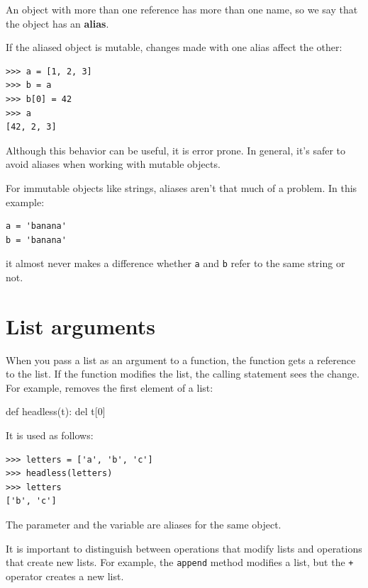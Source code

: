 An object with more than one reference has more than one name, so we say that the object has an \textbf{alias}.

If the aliased object is mutable, changes made with one alias affect the other:

\begin{Verbatim}[frame=single]
>>> a = [1, 2, 3]
>>> b = a
>>> b[0] = 42
>>> a
[42, 2, 3]
\end{Verbatim}
%
Although this behavior can be useful, it is error prone. In general, it's safer to avoid aliases when working with mutable objects.

For immutable objects like strings, aliases aren't that much of a problem. In this example:

\begin{Verbatim}[frame=single]
a = 'banana'
b = 'banana'
\end{Verbatim}
%
it almost never makes a difference whether \texttt{a} and \texttt{b} refer to the same string or not.


\section{List arguments}
\label{list.arguments}

When you pass a list as an argument to a function, the function gets a reference to the list. If the function modifies the list, the calling statement sees the change. For example,  removes the first element of a list:

\begin{python}[frame=single]
def headless(t):
    del t[0]
\end{python}
%
It is used as follows:

\begin{Verbatim}[frame=single]
>>> letters = ['a', 'b', 'c']
>>> headless(letters)
>>> letters
['b', 'c']
\end{Verbatim}
%
The parameter  and the variable  are aliases for the same object.

It is important to distinguish between operations that modify lists and operations that create new lists. For example, the \texttt{append} method modifies a list, but the \texttt{+} operator creates a new list.

